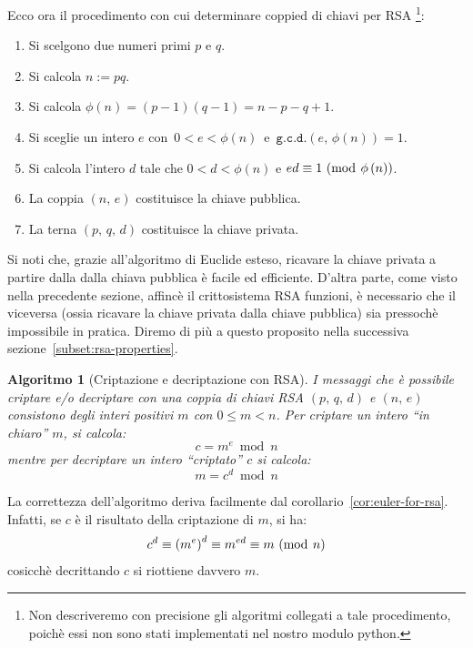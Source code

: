 \documentclass[pdflatex,11pt,a4paper,oneside]{article}
\newcommand{\p}[1]{\left({#1}\right)}
\newcommand{\ephi}[1]{\ensuremath{\phi\p{#1}}}
\newcommand{\congruent}[0]{\equiv}
\newcommand{\mmodop}[0]{\ensuremath{\operatorname{mod}}}
\newcommand{\mmod}[1]{\ensuremath{\allowbreak\ (\mmodop\:{#1})}}
\newcommand{\rem}[2]{\ensuremath{{#1}\:\mmodop\:{#2}}}
\newcommand{\gcdop}[0]{\ensuremath{\mathtt{g.c.d.}}}
\newcommand{\xgcd}[1]{\ensuremath{\gcdop\left({#1}\right)}}
\renewcommand{\gcd}[2]{\xgcd{{#1},\,{#2}}}
\newtheorem{algorithm}[TheoremLike]{Algoritmo}
\begin{document}
\smallskip\noindent
Ecco ora il procedimento con cui determinare coppied di chiavi per RSA%
\footnote{Non descriveremo con precisione gli algoritmi collegati a tale
procedimento, poich\`e essi non sono stati implementati nel nostro modulo
python.}:
\begin{enumerate}\label{enum:rsa-keys}
 \item Si scelgono due numeri primi $p$ e $q$.
 \item Si calcola $n := pq$.
 \item Si calcola $\ephi{n} =  (p - 1) (q - 1) = n - p - q + 1$.
 \item Si sceglie un intero $e$ con \,$0 < e < \ephi{n}$\, e\,
       $\gcd{e}{\ephi{n}} = 1$.
 \item Si calcola l'intero $d$ tale che $0 < d < \ephi{n}$ e
       $ed \congruent 1 \mmod {\ephi{n}}$.
 \item La coppia $(n,\,e)$ costituisce la chiave pubblica.
 \item La terna $(p,\,q,\,d)$ costituisce la chiave privata.
\end{enumerate}

Si noti che, grazie all'algoritmo di Euclide esteso, ricavare la
chiave privata a partire dalla dalla chiava pubblica \`e facile ed
efficiente. D'altra parte, come visto nella precedente sezione,
affinc\`e il crittosistema RSA funzioni, \`e necessario che il
viceversa (ossia ricavare la chiave privata dalla chiave pubblica)
sia pressoch\`e impossibile in pratica. Diremo di pi\`u a questo
proposito nella successiva sezione~\eqref{subset:rsa-properties}.

\begin{algorithm}[Criptazione e decriptazione con RSA]
I messaggi che \`e possibile criptare e/o decriptare con una coppia
di chiavi RSA $(p,\,q,\,d)$ e $(n,\,e)$ consistono degli interi positivi
$m$ con $0 \leq m < n$. Per \emph{criptare} un intero ``in chiaro'' $m$,
si calcola:
\begin{equation}\label{eq:rsa-crypt}
  c = \rem{m^e}{n}
\end{equation}
mentre per \emph{decriptare} un intero ``criptato'' $c$ si calcola:
\begin{equation}\label{eq:rsa-decrypt}
  m = \rem{c^d}{n}
\end{equation}
\end{algorithm}

La correttezza dell'algoritmo deriva facilmente dal
corollario~\eqref{cor:euler-for-rsa}.  Infatti, se $c$ \`e il
risultato della criptazione di $m$, si ha:
  $$c^d \congruent {\p{m^e}}^d \congruent m^{ed} \congruent m \mmod n$$
cosicch\`e decrittando $c$ si riottiene davvero $m$.
\end{document}

